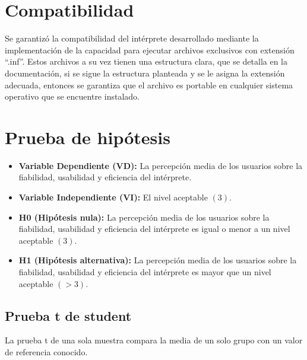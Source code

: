 \section{Compatibilidad}
Se garantizó la compatibilidad del intérprete desarrollado mediante la implementación de la capacidad para ejecutar archivos exclusivos con extensión “.inf”. Estos archivos a su vez tienen una estructura clara, que se detalla en la documentación, si se sigue la estructura planteada y se le asigna la extensión adecuada, entonces se garantiza que el archivo es portable en cualquier sistema operativo que se encuentre instalado.

\section{Prueba de hipótesis}
\begin{itemize}
  \item \textbf{Variable Dependiente (VD):} La percepción media de los usuarios sobre la fiabilidad, usabilidad y eficiencia del intérprete.
  \item \textbf{Variable Independiente (VI):} El nivel aceptable $(3)$.
  \item \textbf{H0 (Hipótesis nula):} La percepción media de los usuarios sobre la fiabilidad, usabilidad y eficiencia del intérprete es igual o menor a un nivel aceptable $(3)$.
  \item \textbf{H1 (Hipótesis alternativa):} La percepción media de los usuarios sobre la fiabilidad, usabilidad y eficiencia del intérprete es mayor que un nivel aceptable $(>3)$.
\end{itemize}

\subsection{Prueba t de student}
La prueba t de una sola muestra compara la media de un solo grupo con un valor de referencia conocido.

